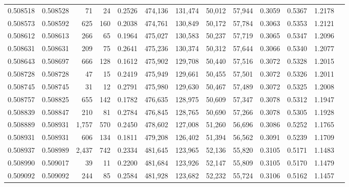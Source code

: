 \begin{tabular}{rrrrrrrrrrrrr}
0.508518 & 0.508528 &    71 &    24 &                                     0.2526 & 474,136 & 131,474 &  50,012 &  57,944 & 0.3059 & 0.5367 & 1.2178 \\
0.508573 & 0.508592 &   625 &   160 &                                     0.2038 & 474,761 & 130,849 &  50,172 &  57,784 & 0.3063 & 0.5353 & 1.2121 \\
0.508612 & 0.508613 &   266 &    65 &                                     0.1964 & 475,027 & 130,583 &  50,237 &  57,719 & 0.3065 & 0.5347 & 1.2096 \\
0.508631 & 0.508631 &   209 &    75 &                                     0.2641 & 475,236 & 130,374 &  50,312 &  57,644 & 0.3066 & 0.5340 & 1.2077 \\
0.508643 & 0.508697 &   666 &   128 &                                     0.1612 & 475,902 & 129,708 &  50,440 &  57,516 & 0.3072 & 0.5328 & 1.2015 \\
0.508728 & 0.508728 &    47 &    15 &                                     0.2419 & 475,949 & 129,661 &  50,455 &  57,501 & 0.3072 & 0.5326 & 1.2011 \\
0.508745 & 0.508745 &    31 &    12 &                                     0.2791 & 475,980 & 129,630 &  50,467 &  57,489 & 0.3072 & 0.5325 & 1.2008 \\
0.508757 & 0.508825 &   655 &   142 &                                     0.1782 & 476,635 & 128,975 &  50,609 &  57,347 & 0.3078 & 0.5312 & 1.1947 \\
0.508839 & 0.508847 &   210 &    81 &                                     0.2784 & 476,845 & 128,765 &  50,690 &  57,266 & 0.3078 & 0.5305 & 1.1928 \\
0.508889 & 0.508931 & 1,757 &   570 &                                     0.2450 & 478,602 & 127,008 &  51,260 &  56,696 & 0.3086 & 0.5252 & 1.1765 \\
0.508931 & 0.508931 &   606 &   134 &                                     0.1811 & 479,208 & 126,402 &  51,394 &  56,562 & 0.3091 & 0.5239 & 1.1709 \\
0.508937 & 0.508989 & 2,437 &   742 &                                     0.2334 & 481,645 & 123,965 &  52,136 &  55,820 & 0.3105 & 0.5171 & 1.1483 \\
0.508990 & 0.509017 &    39 &    11 &                                     0.2200 & 481,684 & 123,926 &  52,147 &  55,809 & 0.3105 & 0.5170 & 1.1479 \\
0.509092 & 0.509092 &   244 &    85 &                                     0.2584 & 481,928 & 123,682 &  52,232 &  55,724 & 0.3106 & 0.5162 & 1.1457 \\

\end{tabular}
